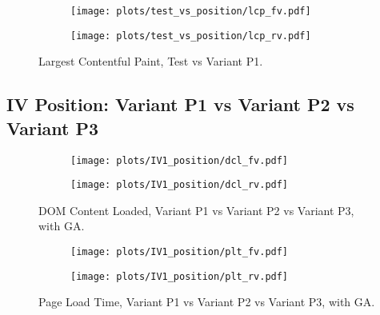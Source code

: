 \clearpage

\begin{figure}
	\centering
	\begin{subfigure}{.5\textwidth}
		\centering
		\texttt{[image: plots/test\_vs\_position/lcp\_fv.pdf]}
		\label{fig:sub1}
	\end{subfigure}%
	\begin{subfigure}{.5\textwidth}
		\centering
		\texttt{[image: plots/test\_vs\_position/lcp\_rv.pdf]}
		\label{fig:sub2}
	\end{subfigure}
	\caption{Largest Contentful Paint, Test vs Variant P1.}
	\label{figure:plt_original_test}
\end{figure}






\subsection{IV Position: Variant P1 vs Variant P2 vs Variant P3}







\begin{figure}
	\centering
	\begin{subfigure}{.5\textwidth}
		\centering
		\texttt{[image: plots/IV1\_position/dcl\_fv.pdf]}
		\label{fig:sub1}
	\end{subfigure}%
	\begin{subfigure}{.5\textwidth}
		\centering
		\texttt{[image: plots/IV1\_position/dcl\_rv.pdf]}
		\label{fig:sub2}
	\end{subfigure}
	\caption{DOM Content Loaded, Variant P1 vs Variant P2 vs Variant P3, with GA.}
	\label{figure:plt_original_test}
\end{figure}



\begin{figure}
	\centering
	\begin{subfigure}{.5\textwidth}
		\centering
		\texttt{[image: plots/IV1\_position/plt\_fv.pdf]}
		\label{fig:sub1}
	\end{subfigure}%
	\begin{subfigure}{.5\textwidth}
		\centering
		\texttt{[image: plots/IV1\_position/plt\_rv.pdf]}
		\label{fig:sub2}
	\end{subfigure}
	\caption{Page Load Time, Variant P1 vs Variant P2 vs Variant P3, with GA.}
	\label{figure:plt_original_test}
\end{figure}

